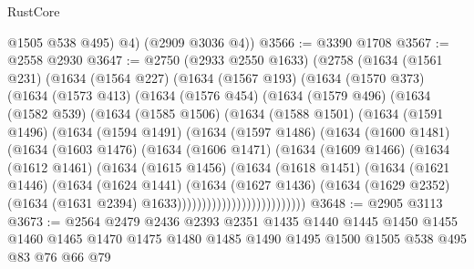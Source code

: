 \begin{lexlean}{RustCore}
\begin{coremodule}
          @1505
          @538
          @495)
        @4)
      (@2909 @3036 @4))
@3566 := @3390 @1708
@3567 := @2558 @2930
@3647 := @2750
    (@2933 @2550 @1633)
    (@2758
      (@1634
        (@1561 @231)
        (@1634
          (@1564 @227)
          (@1634
            (@1567 @193)
            (@1634
              (@1570 @373)
              (@1634
                (@1573 @413)
                (@1634
                  (@1576 @454)
                  (@1634
                    (@1579 @496)
                    (@1634
                      (@1582 @539)
                      (@1634
                        (@1585 @1506)
                        (@1634
                          (@1588 @1501)
                          (@1634
                            (@1591 @1496)
                            (@1634
                              (@1594 @1491)
                              (@1634
                                (@1597 @1486)
                                (@1634
                                  (@1600 @1481)
                                  (@1634
                                    (@1603 @1476)
                                    (@1634
                                      (@1606 @1471)
                                      (@1634
                                        (@1609 @1466)
                                        (@1634
                                          (@1612 @1461)
                                          (@1634
                                            (@1615 @1456)
                                            (@1634
                                              (@1618 @1451)
                                              (@1634
                                                (@1621 @1446)
                                                (@1634
                                                  (@1624 @1441)
                                                  (@1634
                                                    (@1627 @1436)
                                                    (@1634
                                                      (@1629 @2352)
                                                      (@1634
                                                        (@1631 @2394)
                                                        @1633))))))))))))))))))))))))))
@3648 := @2905 @3113
@3673 := @2564
    @2479
    @2436
    @2393
    @2351
    @1435
    @1440
    @1445
    @1450
    @1455
    @1460
    @1465
    @1470
    @1475
    @1480
    @1485
    @1490
    @1495
    @1500
    @1505
    @538
    @495
    @83
    @76
    @66
    @79

\end{coremodule}
\end{lexlean}
